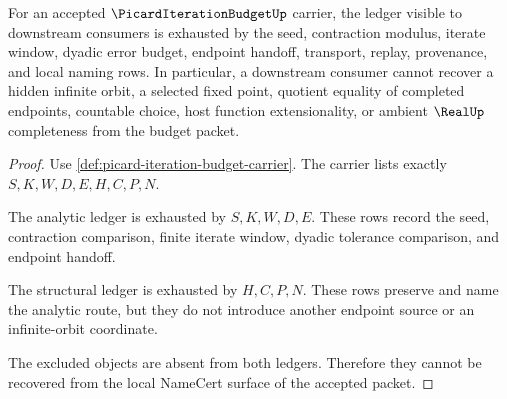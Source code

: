 \begin{theorem}
\label{thm:picard-iteration-budget-ledger-nonescape}
For an accepted $\PicardIterationBudgetUp$ carrier, the ledger visible to downstream consumers is exhausted by the seed, contraction modulus, iterate window, dyadic error budget, endpoint handoff, transport, replay, provenance, and local naming rows. In particular, a downstream consumer cannot recover a hidden infinite orbit, a selected fixed point, quotient equality of completed endpoints, countable choice, host function extensionality, or ambient $\RealUp$ completeness from the budget packet.
\end{theorem}
\begin{proof}
Use \autoref{def:picard-iteration-budget-carrier}. The carrier lists exactly $S,K,W,D,E,H,C,P,N$.

The analytic ledger is exhausted by $S,K,W,D,E$. These rows record the seed, contraction comparison, finite iterate window, dyadic tolerance comparison, and endpoint handoff.

The structural ledger is exhausted by $H,C,P,N$. These rows preserve and name the analytic route, but they do not introduce another endpoint source or an infinite-orbit coordinate.

The excluded objects are absent from both ledgers. Therefore they cannot be recovered from the local NameCert surface of the accepted packet.
\end{proof}




